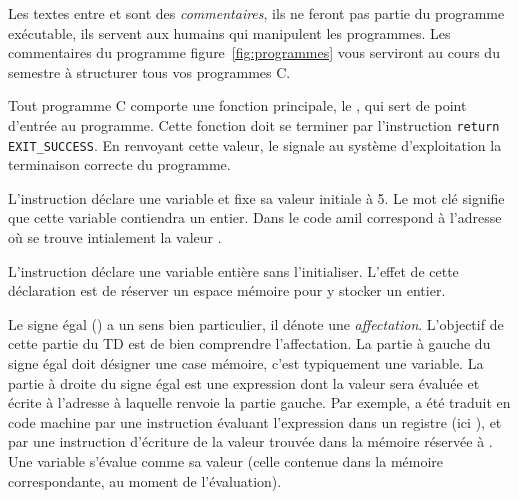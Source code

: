 Les textes entre \C{/*} et \C{*/} sont des \emph{commentaires}, ils ne feront pas partie du programme exécutable, ils servent aux humains qui manipulent les programmes. Les commentaires du programme figure~\ref{fig:programmes} vous serviront au cours du semestre à structurer tous vos programmes C.

Tout programme C comporte une fonction principale, le , qui sert de point d'entrée au programme. Cette fonction doit se terminer par l'instruction \verb+return EXIT_SUCCESS+. En renvoyant cette valeur, le  signale au système d'exploitation la terminaison correcte du programme.



L'instruction  déclare une variable  et fixe sa valeur initiale à 5. Le mot clé  signifie que cette variable contiendra un entier. Dans le code amil  correspond à l'adresse  où se trouve intialement la valeur .

L'instruction  déclare une variable entière  sans l'initialiser. L'effet de cette déclaration est de réserver un espace mémoire pour y stocker un entier. 

Le signe égal (\C{=}) a un sens bien particulier, il dénote une
\emph{affectation}. L'objectif de cette partie du TD est de bien comprendre
l'affectation.  La partie à gauche du signe égal doit désigner une case mémoire, c'est typiquement une variable. La partie à droite du signe égal est une expression dont la valeur sera évaluée et écrite à l'adresse à laquelle renvoie la partie gauche. Par exemple,  a été traduit en code machine par une instruction évaluant l'expression  dans un registre (ici ), et par une instruction d'écriture de la valeur trouvée dans la mémoire réservée à . Une variable s'évalue comme sa valeur (celle contenue dans la mémoire correspondante, au moment de l'évaluation).

